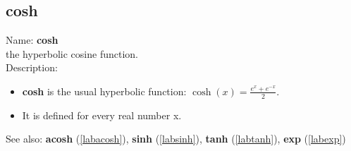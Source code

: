 \subsection{cosh}
\label{labcosh}
\noindent Name: \textbf{cosh}\\
the hyperbolic cosine function.\\

\noindent Description: \begin{itemize}

\item \textbf{cosh} is the usual hyperbolic function: $\cosh(x) = \frac{e^x + e^{-x}}{2}$.

\item It is defined for every real number x.
\end{itemize}
See also: \textbf{acosh} (\ref{labacosh}), \textbf{sinh} (\ref{labsinh}), \textbf{tanh} (\ref{labtanh}), \textbf{exp} (\ref{labexp})
